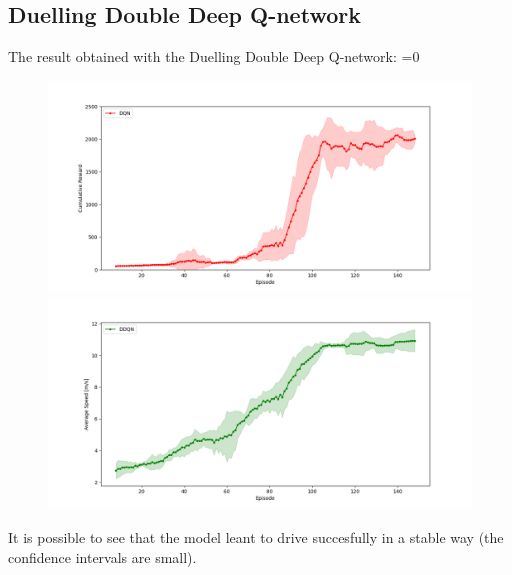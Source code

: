 \documentclass[14pt]{extarticle}
\def\sp{\vspace{5pt}}
\newcounter{debug}
\begin{document}
\begin{flushleft}
\subsection{Duelling Double Deep Q-network}
\sp
The result obtained with the Duelling Double Deep Q-network:
\vspace{-5mm}
\ifnum\value{debug}=0 {
	\begin{figure}[H]
    		\centering\includegraphics[width=1\textwidth]{./Image/Results/DDD/plot2_reward.png}
    		\vspace{-5mm}
    		\centering\includegraphics[width=1\textwidth]{./Image/Results/DDD/plot2_speed.png}
	\end{figure}
	}\fi
	It is possible to see that the model leant to drive succesfully in a stable way (the confidence intervals are small).
	

\end{flushleft}
\end{document}
